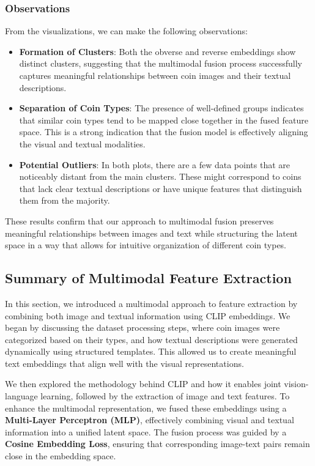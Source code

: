 \documentclass[nolibertine, english, algorithm, nomencl, minted]{ttlab-qualify}
\begin{document}
\subsubsection{Observations}

From the visualizations, we can make the following observations:

\begin{itemize}
    \item \textbf{Formation of Clusters}: Both the obverse and reverse embeddings show distinct clusters, 
    suggesting that the multimodal fusion process successfully captures meaningful relationships between coin 
    images and their textual descriptions.
    
    \item \textbf{Separation of Coin Types}: The presence of well-defined groups indicates that similar coin types tend to 
    be mapped close together in the fused feature space. This is a strong indication that the fusion model is effectively aligning 
    the visual and textual modalities.

    \item \textbf{Potential Outliers}: In both plots, there are a few data points that are noticeably distant from the main clusters. 
    These might correspond to coins that lack clear textual descriptions or have unique features that distinguish them from the majority.
\end{itemize}

These results confirm that our approach to multimodal fusion preserves meaningful relationships between images and text 
while structuring the latent space in a way that allows for intuitive organization of different coin types.

\subsection{Summary of Multimodal Feature Extraction}
In this section, we introduced a multimodal approach to feature extraction by combining both image and textual information 
using CLIP embeddings. We began by discussing the dataset processing steps, where coin images were categorized based on their types, 
and how textual descriptions were generated dynamically using structured templates. This allowed us to create meaningful text embeddings 
that align well with the visual representations.

We then explored the methodology behind CLIP and how it enables joint vision-language learning, followed by the extraction of 
image and text features. To enhance the multimodal representation, we fused these embeddings using 
a \textbf{Multi-Layer Perceptron (MLP)}, effectively combining visual and textual information into a unified latent space. 
The fusion process was guided by a \textbf{Cosine Embedding Loss}, ensuring that corresponding image-text pairs remain close in the 
embedding space.
\end{document}
